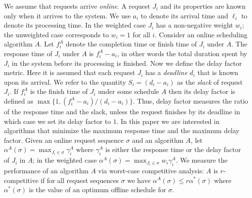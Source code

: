 We assume that requests arrive \emph{online}. A request $J_i$ and its
properties are known only when it arrives to the system.  We use
$a_i$ to denote its arrival time and $\ell_i$ to denote its
processing time. In the weighted case $J_i$ has a non-negative
weight $w_i$; the unweighted case corresponds to $w_i=1$ for all
$i$. Consider an online scheduling algorithm $A$. Let $f^A_i$ denote
the completion time or finish time of $J_i$ under $A$.  The response
time of $J_i$ under $A$ is $f^A_i - a_i$, in other words the total
duration spent by $J_i$ in the system before its processing is
finished. Now we define the delay factor metric. Here it is
assumed that each request $J_i$ has a \emph{deadline} $d_i$ that is
known upon its arrival. We refer to the quantity $S_i = (d_i-a_i)$
as the \emph{slack} of request $J_i$. If $f^A_i$ is the finish time
of $J_i$ under some schedule $A$ then its delay factor is defined as
$\max \{ 1, {(f^A_i - a_i)}/{(d_i - a_i)}\}$. Thus, delay factor
measures the ratio of the response time and the slack, unless the
request finishes by its deadline in which case we set its delay
factor to $1$.  In this paper we are interested in algorithms that
minimize the maximum response time and the maximum delay factor.
Given an online request sequence $\sigma$ and an algorithm $A$, let
$\alpha^A(\sigma) = \max_{J_i \in \sigma} \gamma^A_i$ where
$\gamma^A_i$ is either the response time or the delay factor of
$J_i$ in $A$; in the weighted case $\alpha^A(\sigma) = \max_{J_i \in
\sigma} w_i \gamma^A_i$.  We measure the performance of an algorithm
$A$ via worst-case competitive analysis: $A$ is $r$-competitive if
for all request sequences $\sigma$ we have $\alpha^A(\sigma) \le r
\alpha^*(\sigma)$ where $\alpha^*(\sigma)$ is the value of an
optimum offline schedule for $\sigma$.
